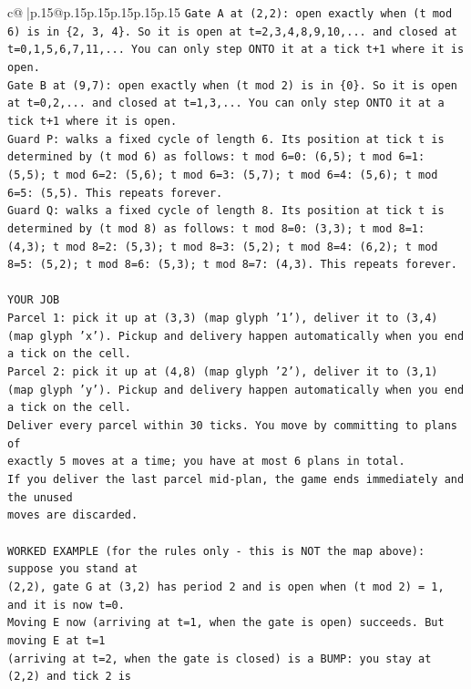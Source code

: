 \documentclass{article}
\begin{document}
{\begin{supertabular}{c@{$\;$}|p{.15\linewidth}@{}p{.15\linewidth}p{.15\linewidth}p{.15\linewidth}p{.15\linewidth}p{.15\linewidth}}
{{{\texttt{Gate A at (2,2): open exactly when (t mod 6) is in \{2, 3, 4\}. So it is open at t=2,3,4,8,9,10,... and closed at t=0,1,5,6,7,11,... You can only step ONTO it at a tick t+1 where it is open.} \\
\texttt{Gate B at (9,7): open exactly when (t mod 2) is in \{0\}. So it is open at t=0,2,... and closed at t=1,3,... You can only step ONTO it at a tick t+1 where it is open.} \\
\texttt{Guard P: walks a fixed cycle of length 6. Its position at tick t is determined by (t mod 6) as follows: t mod 6=0: (6,5); t mod 6=1: (5,5); t mod 6=2: (5,6); t mod 6=3: (5,7); t mod 6=4: (5,6); t mod 6=5: (5,5). This repeats forever.} \\
\texttt{Guard Q: walks a fixed cycle of length 8. Its position at tick t is determined by (t mod 8) as follows: t mod 8=0: (3,3); t mod 8=1: (4,3); t mod 8=2: (5,3); t mod 8=3: (5,2); t mod 8=4: (6,2); t mod 8=5: (5,2); t mod 8=6: (5,3); t mod 8=7: (4,3). This repeats forever.} \\
\\ 
\texttt{YOUR JOB} \\
\texttt{Parcel 1: pick it up at (3,3) (map glyph '1'), deliver it to (3,4) (map glyph 'x'). Pickup and delivery happen automatically when you end a tick on the cell.} \\
\texttt{Parcel 2: pick it up at (4,8) (map glyph '2'), deliver it to (3,1) (map glyph 'y'). Pickup and delivery happen automatically when you end a tick on the cell.} \\
\texttt{Deliver every parcel within 30 ticks. You move by committing to plans of} \\
\texttt{exactly 5 moves at a time; you have at most 6 plans in total.} \\
\texttt{If you deliver the last parcel mid{-}plan, the game ends immediately and the unused} \\
\texttt{moves are discarded.} \\
\\ 
\texttt{WORKED EXAMPLE (for the rules only {-} this is NOT the map above): suppose you stand at} \\
\texttt{(2,2), gate G at (3,2) has period 2 and is open when (t mod 2) = 1, and it is now t=0.} \\
\texttt{Moving E now (arriving at t=1, when the gate is open) succeeds. But moving E at t=1} \\
\texttt{(arriving at t=2, when the gate is closed) is a BUMP: you stay at (2,2) and tick 2 is} \\
}}}
\end{supertabular}}
\end{document}
